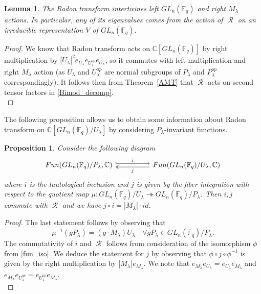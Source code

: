 \documentclass[12pt,reqno]{amsart}
\newtheorem{lem}[thm]{Lemma}
\newtheorem{prop}[thm]{Proposition}
\theoremstyle{definition}
\theoremstyle{remark}
\newcommand{\thmref}[1]{Theorem~\ref{#1}}
\numberwithin{equation}{section}
\DeclareMathOperator{\R}{\mathcal{R}}
\begin{document}
\begin{lem}\label{intertwine}
    The Radon transform intertwines left $GL_n(\mathbb{F}_q)$ and right $M_{\lambda}$ actions. In particular, any of its eigenvalues comes from the action of $\R$ on an irreducible representation $V$ of $GL_n(\mathbb{F}_q)$.
\end{lem}
\begin{proof}
    We know that Radon transform acts on $\mathbb{C}[GL_n(\mathbb{F}_q)]$ by right multiplication by $|U_{\lambda}|^2 e_{U_{\lambda}}e_{U_{\lambda}^{op}}e_{U_{\lambda}}$, so it commutes with left multiplication and right $M_{\lambda}$ action (as $U_{\lambda}$ and $U_{\lambda}^{op}$ are normal subgroups of $P_{\lambda}$ and $P_{\lambda}^{op}$ correspondingly). It follows then from \thmref{AMT} that $\R$ acts on second tensor factors in \eqref{Bimod_decomp}.\\
\end{proof}

The following proposition allows us to obtain some information about Radon transform on $\mathbb{C}[GL_n(\mathbb{F}_q)/U_{\lambda}]$ by considering $P_{\lambda}$-invariant functions.\\

\begin{prop}\label{parabolic-unipotent}
    Consider the following diagram
    \begin{equation}\label{parabolic-unipotent_maps}
        \begin{tikzcd}
{Fun(GL_n(\mathbb{F}_q)/P_{\lambda},\mathbb{C})} \arrow[rr, "i", hook, shift left] &  & {Fun(GL_n(\mathbb{F}_q)/U_{\lambda},\mathbb{C})} \arrow[ll, "j", two heads, shift left]
\end{tikzcd}
    \end{equation}
    where $i$ is the tautological inclusion and $j$ is given by the fiber integration with respect to the quotient map $\mu: GL_n(\mathbb{F}_q)/U_{\lambda} \twoheadrightarrow GL_n(\mathbb{F}_q)/P_{\lambda}$. Then $i,j$ commute with $\R$ and we have $j\circ i = |M_{\lambda}| \cdot id$.
\end{prop}
\begin{proof}
    The last statement follows by observing that 
    \begin{equation*}
        \mu^{-1}(gP_{\lambda})=(g\cdot M_{\lambda}) U_{\lambda} \quad \forall gP_{\lambda}\in GL_n(\mathbb{F}_q)/P_{\lambda}.
    \end{equation*}
    The commutativity of $i$ and $\R$ follows from consideration of the isomorphism $\phi$ from \eqref{fun_iso}. We deduce the statement for $j$ by observing that $\phi\circ j \circ \phi^{-1}$ is given by the right multiplication by $|M_{\lambda}|e_{M_{\lambda}}$. We note that $e_{M_{\lambda}}e_{U_{\lambda}}=e_{U_{\lambda}}e_{M_{\lambda}}$ and $e_{M_{\lambda}}e_{U_{\lambda}^{op}}=e_{U_{\lambda}^{op}}e_{M_{\lambda}}$.\\
\end{proof}
\end{document}
